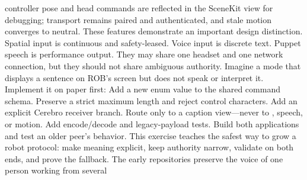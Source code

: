 \markdownRendererUlItem controller pose and head commands are reflected in the SceneKit view for\markdownRendererSoftLineBreak
{}debugging;\markdownRendererUlItemEnd 
\markdownRendererUlItem transport remains paired and authenticated, and stale motion converges to\markdownRendererSoftLineBreak
{}neutral.\markdownRendererUlItemEnd 
\markdownRendererUlEnd \markdownRendererInterblockSeparator
{}These features demonstrate an important design distinction. Spatial input is\markdownRendererSoftLineBreak
{}continuous and safety-leased. Voice input is discrete text. Puppet speech is\markdownRendererSoftLineBreak
{}performance output. They may share one headset and one network connection, but\markdownRendererSoftLineBreak
{}they should not share ambiguous authority.\markdownRendererInterblockSeparator
{}
\markdownRendererSectionEnd \markdownRendererSectionBegin
{}\markdownRendererInterblockSeparator
{}Imagine a  mode that displays a sentence on ROB's screen but does\markdownRendererSoftLineBreak
{}not speak or interpret it. Implement it on paper first:\markdownRendererInterblockSeparator
{}\markdownRendererOlBegin
{}Add a new enum value to the shared command schema.\markdownRendererOlItemEnd 
{}Preserve a strict maximum length and reject control characters.\markdownRendererOlItemEnd 
{}Add an explicit Cerebro receiver branch.\markdownRendererOlItemEnd 
{}Route only to a caption view—never to , speech, or motion.\markdownRendererOlItemEnd 
{}Add encode/decode and legacy-payload tests.\markdownRendererOlItemEnd 
{}Build both applications and test an older peer's behavior.\markdownRendererOlItemEnd 
\markdownRendererOlEnd \markdownRendererInterblockSeparator
{}This exercise teaches the safest way to grow a robot protocol: make meaning\markdownRendererSoftLineBreak
{}explicit, keep authority narrow, validate on both ends, and prove the fallback.\markdownRendererInterblockSeparator
{}\markdownRendererThematicBreak{}\markdownRendererInterblockSeparator
{}
\markdownRendererSectionEnd 
\markdownRendererSectionEnd \markdownRendererSectionBegin
{}\markdownRendererInterblockSeparator
{}The early repositories preserve the voice of one person working from several\markdownRendererSoftLineBreak
